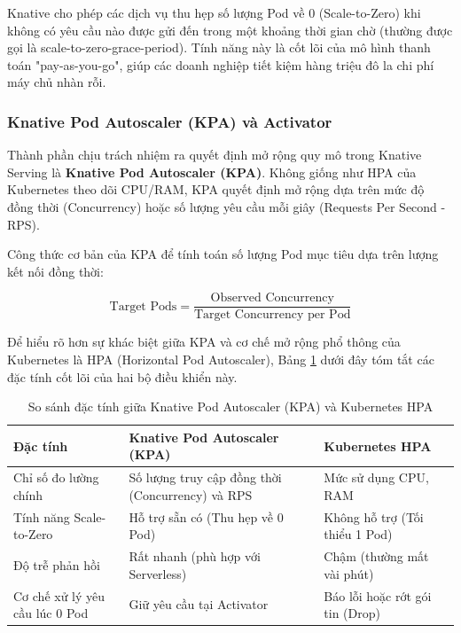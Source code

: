 Knative cho phép các dịch vụ thu hẹp số lượng Pod về 0 (Scale-to-Zero) khi không có yêu cầu nào được gửi đến trong một khoảng thời gian chờ (thường được gọi là scale-to-zero-grace-period). Tính năng này là cốt lõi của mô hình thanh toán "pay-as-you-go", giúp các doanh nghiệp tiết kiệm hàng triệu đô la chi phí máy chủ nhàn rỗi.

\subsubsection{Knative Pod Autoscaler (KPA) và Activator}
Thành phần chịu trách nhiệm ra quyết định mở rộng quy mô trong Knative Serving là \textbf{Knative Pod Autoscaler (KPA)}. Không giống như HPA của Kubernetes theo dõi CPU/RAM, KPA quyết định mở rộng dựa trên mức độ đồng thời (Concurrency) hoặc số lượng yêu cầu mỗi giây (Requests Per Second - RPS).

Công thức cơ bản của KPA để tính toán số lượng Pod mục tiêu dựa trên lượng kết nối đồng thời:

\begin{equation}
    \text{Target Pods} = \frac{\text{Observed Concurrency}}{\text{Target Concurrency per Pod}}
\end{equation}

Để hiểu rõ hơn sự khác biệt giữa KPA và cơ chế mở rộng phổ thông của Kubernetes là HPA (Horizontal Pod Autoscaler), Bảng \ref{tab:kpa_vs_hpa} dưới đây tóm tắt các đặc tính cốt lõi của hai bộ điều khiển này.

\begin{table}[h!]
    \centering
    \caption{So sánh đặc tính giữa Knative Pod Autoscaler (KPA) và Kubernetes HPA}
    \label{tab:kpa_vs_hpa}
    \begin{tabular}{|p{4.5cm}|p{5cm}|p{5cm}|}
        \hline
        \textbf{Đặc tính} & \textbf{Knative Pod Autoscaler (KPA)} & \textbf{Kubernetes HPA} \\
        \hline
        Chỉ số đo lường chính & Số lượng truy cập đồng thời (Concurrency) và RPS & Mức sử dụng CPU, RAM \\
        \hline
        Tính năng Scale-to-Zero & Hỗ trợ sẵn có (Thu hẹp về 0 Pod) & Không hỗ trợ (Tối thiểu 1 Pod) \\
        \hline
        Độ trễ phản hồi & Rất nhanh (phù hợp với Serverless) & Chậm (thường mất vài phút) \\
        \hline
        Cơ chế xử lý yêu cầu lúc 0 Pod & Giữ yêu cầu tại Activator & Báo lỗi hoặc rớt gói tin (Drop) \\
        \hline
    \end{tabular}
\end{table}

